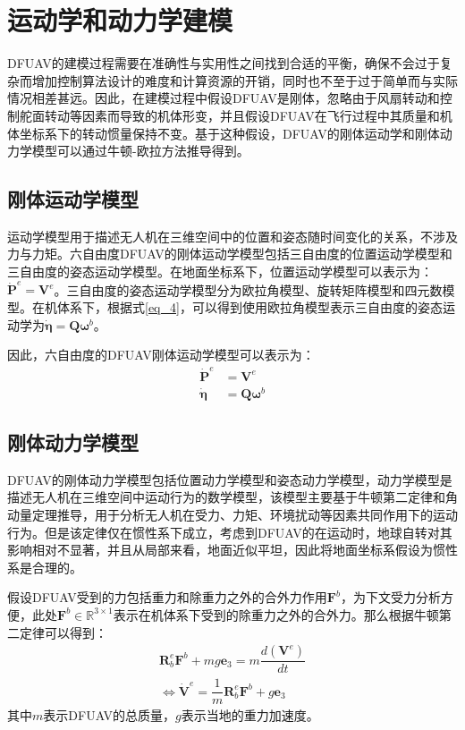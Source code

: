 \section{运动学和动力学建模}

DFUAV的建模过程需要在准确性与实用性之间找到合适的平衡，确保不会过于复杂而增加控制算法设计的难度和计算资源的开销，同时也不至于过于简单而与实际情况相差甚远。因此，在建模过程中假设DFUAV是刚体，忽略由于风扇转动和控制舵面转动等因素而导致的机体形变，并且假设DFUAV在飞行过程中其质量和机体坐标系下的转动惯量保持不变。基于这种假设，DFUAV的刚体运动学和刚体动力学模型可以通过牛顿-欧拉方法推导得到。

\subsection{刚体运动学模型}

运动学模型用于描述无人机在三维空间中的位置和姿态随时间变化的关系，不涉及力与力矩。六自由度DFUAV的刚体运动学模型包括三自由度的位置运动学模型和三自由度的姿态运动学模型。在地面坐标系下，位置运动学模型可以表示为：$\boldsymbol{\dot{P}}^{e} = \boldsymbol{V}^{e}$。三自由度的姿态运动学模型分为欧拉角模型、旋转矩阵模型和四元数模型。在机体系下，根据式\eqref{eq_4}，可以得到使用欧拉角模型表示三自由度的姿态运动学为$\dot{\boldsymbol{\eta}}=\boldsymbol{Q}\boldsymbol{\omega}^b$。

因此，六自由度的DFUAV刚体运动学模型可以表示为：
\begin{equation}
    \begin{aligned}
    \boldsymbol{\dot{P}}^{e} &= \boldsymbol{V}^{e} \\
    \dot{\boldsymbol{\eta}}&=\boldsymbol{Q}\boldsymbol{\omega}^b
    \end{aligned}
    \label{eq_6}
\end{equation}

\subsection{刚体动力学模型}

DFUAV的刚体动力学模型包括位置动力学模型和姿态动力学模型，动力学模型是描述无人机在三维空间中运动行为的数学模型，该模型主要基于牛顿第二定律和角动量定理推导，用于分析无人机在受力、力矩、环境扰动等因素共同作用下的运动行为。但是该定律仅在惯性系下成立，考虑到DFUAV的在运动时，地球自转对其影响相对不显著，并且从局部来看，地面近似平坦，因此将地面坐标系假设为惯性系是合理的。

假设DFUAV受到的力包括重力和除重力之外的合外力作用$\boldsymbol{F}^b$，为下文受力分析方便，此处$\boldsymbol{F}^b\in\mathbb{R}^{3\times1}$表示在机体系下受到的除重力之外的合外力。那么根据牛顿第二定律可以得到：
\begin{equation}
    \begin{gathered}
    \boldsymbol{R}_b^e\boldsymbol{F}^b + mg\boldsymbol{e}_3 = m\dfrac{d({\boldsymbol{V}}^e)}{dt}
    \\
    \Leftrightarrow\dot{\boldsymbol{V}}^e=\dfrac{1}{m}\boldsymbol{R}_b^e\boldsymbol{F}^b + g\boldsymbol{e}_3 
    \label{eq_7}
    \end{gathered}
\end{equation}
其中$m$表示DFUAV的总质量，$g$表示当地的重力加速度。


